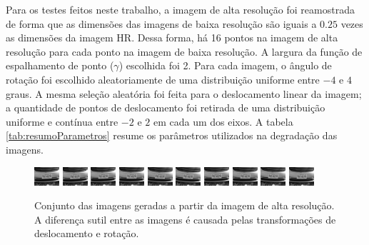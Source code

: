 Para os testes feitos neste trabalho, a imagem de alta resolução foi reamostrada de forma que as dimensões das imagens de baixa resolução são iguais a $0.25$ vezes as dimensões da imagem HR.  
Dessa forma, há 16 pontos na imagem de alta resolução para cada ponto na imagem de baixa resolução.
A largura da função de espalhamento de ponto ($\gamma$) escolhida foi 2.
Para cada imagem, o ângulo de rotação foi escolhido aleatoriamente de uma distribuição uniforme entre $-4$ e $4$ graus.
A mesma seleção aleatória foi feita para o deslocamento linear da imagem; a quantidade de pontos de deslocamento foi retirada de uma distribuição uniforme e contínua entre $-2$ e $2$ em cada um dos eixos.
A tabela \ref{tab:resumoParametros} resume os parâmetros utilizados na degradação das imagens.

\begin{figure}[H]
	\centering
	\caption{\label{fig:frames}
	Conjunto das imagens geradas a partir da imagem de alta resolução. A diferença sutil entre as imagens é causada pelas transformações de deslocamento e rotação.}
	\includegraphics{figures/degradedImg/result-0.png}
	\includegraphics{figures/degradedImg/result-1.png}
	\includegraphics{figures/degradedImg/result-2.png}
	\includegraphics{figures/degradedImg/result-3.png}
	\includegraphics{figures/degradedImg/result-4.png}
	\includegraphics{figures/degradedImg/result-5.png}
	\includegraphics{figures/degradedImg/result-6.png}
	\includegraphics{figures/degradedImg/result-7.png}
	\includegraphics{figures/degradedImg/result-8.png}
	\includegraphics{figures/degradedImg/result-9.png} 


\end{figure}
